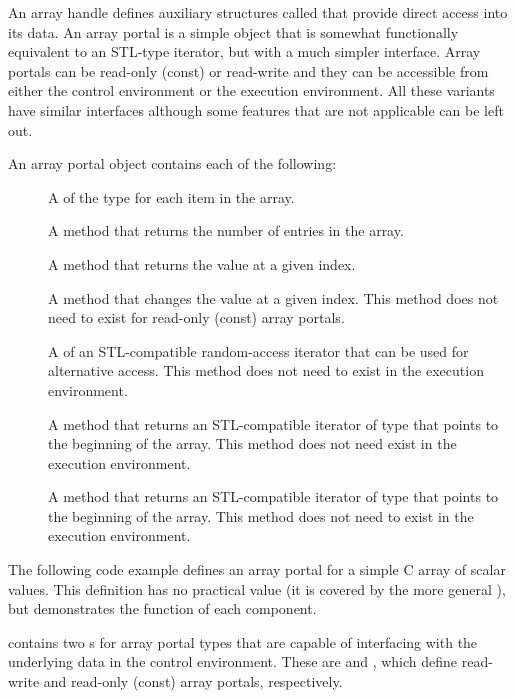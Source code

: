 An array handle defines auxiliary structures called 
that provide direct access into its data. An array portal is a simple
object that is somewhat functionally equivalent to an STL-type iterator, but
with a much simpler interface. Array portals can be read-only (const) or
read-write and they can be accessible from either the control environment
or the execution environment. All these variants have similar interfaces
although some features that are not applicable can be left out.

An array portal object contains each of the following:
\begin{description}
\item[] A  of the type for each item
  in the array.
\item[] A method that returns the number of
  entries in the array.
\item[] A method that returns the value at a given index.
\item[] A method that changes the value at a given
  index. This method does not need to exist for read-only (const) array
  portals.
\item[] A  of an STL-compatible
  random-access iterator that can be used for alternative access. This
  method does not need to exist in the execution environment.
\item[] A method that returns an STL-compatible
  iterator of type  that points to the beginning of
  the array. This method does not need exist in the execution environment.
\item[] A method that returns an STL-compatible
  iterator of type  that points to the beginning of
  the array. This method does not need to exist in the execution
  environment.
\end{description}

The following code example defines an array portal for a simple C array of
scalar values. This definition has no practical value (it is covered by the
more general ), but demonstrates
the function of each component.


 contains two s for array portal
types that are capable of interfacing with the underlying data in the
control environment. These are 
 and ,
 which define read-write and read-only (const)
array portals, respectively.

